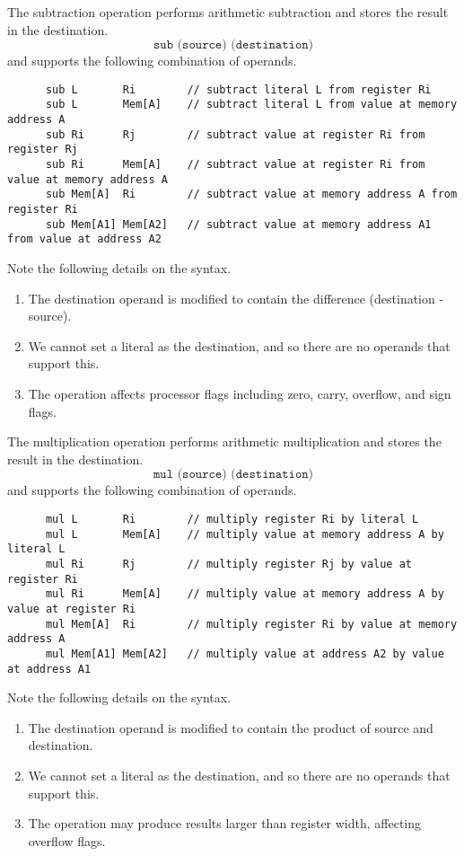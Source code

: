   \begin{definition}[Subtraction]
    The subtraction operation performs arithmetic subtraction and stores the result in the destination.
    \begin{equation}
      \texttt{sub (source) (destination)}
    \end{equation}
    and supports the following combination of operands.
    \begin{lstlisting}
      sub L       Ri        // subtract literal L from register Ri
      sub L       Mem[A]    // subtract literal L from value at memory address A
      sub Ri      Rj        // subtract value at register Ri from register Rj
      sub Ri      Mem[A]    // subtract value at register Ri from value at memory address A
      sub Mem[A]  Ri        // subtract value at memory address A from register Ri
      sub Mem[A1] Mem[A2]   // subtract value at memory address A1 from value at address A2
    \end{lstlisting}
    Note the following details on the syntax.
    \begin{enumerate}
      \item The destination operand is modified to contain the difference (destination - source).
      \item We cannot set a literal as the destination, and so there are no operands that support this.
      \item The operation affects processor flags including zero, carry, overflow, and sign flags.
    \end{enumerate}
  \end{definition}

  \begin{definition}[Multiplication]
    The multiplication operation performs arithmetic multiplication and stores the result in the destination.
    \begin{equation}
      \texttt{mul (source) (destination)}
    \end{equation}
    and supports the following combination of operands.
    \begin{lstlisting}
      mul L       Ri        // multiply register Ri by literal L
      mul L       Mem[A]    // multiply value at memory address A by literal L
      mul Ri      Rj        // multiply register Rj by value at register Ri
      mul Ri      Mem[A]    // multiply value at memory address A by value at register Ri
      mul Mem[A]  Ri        // multiply register Ri by value at memory address A
      mul Mem[A1] Mem[A2]   // multiply value at address A2 by value at address A1
    \end{lstlisting}
    Note the following details on the syntax.
    \begin{enumerate}
      \item The destination operand is modified to contain the product of source and destination.
      \item We cannot set a literal as the destination, and so there are no operands that support this.
      \item The operation may produce results larger than register width, affecting overflow flags.
    \end{enumerate}
  \end{definition}

